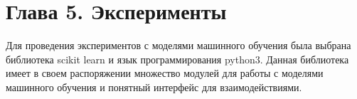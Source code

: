 
\section{Глава 5. Эксперименты}

Для проведения экспериментов с моделями машинного обучения была выбрана библиотека scikit learn \cite{sklearn} и язык программирования python3. Данная библиотека имеет в своем распоряжении множество модулей для работы с моделями машинного обучения и понятный интерфейс для взаимодействиями. 




